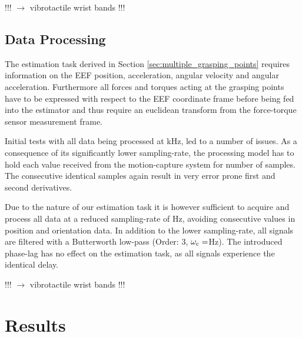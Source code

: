 !!! $\longrightarrow$ vibrotactile wrist bands !!!

\subsection{Data Processing}
The estimation task derived in Section \ref{sec:multiple_grasping_points} requires information on the EEF position, acceleration, angular velocity and angular acceleration. Furthermore all forces and torques acting at the grasping points have to be expressed with respect to the EEF coordinate frame before being fed into the estimator and thus require an euclidean transform from the force-torque sensor measurement frame.

Initial tests with all data being processed at \unit[1]{kHz}, led to a number of issues. As a consequence of its significantly lower sampling-rate, the processing model has to hold each value received from the motion-capture system for number of samples.  The consecutive identical samples again result in very error prone first
and second derivatives.

Due to the nature of our estimation task it is however sufficient to acquire and process all data at a reduced sampling-rate of \unit[100]{Hz}, avoiding consecutive values in position and orientation data. In addition to the lower sampling-rate, all signals are filtered with a Butterworth low-pass (Order: 3, $\omega_{\mathrm{c}} = $\unit[30]{Hz}). The introduced phase-lag has no effect on the estimation task, as all signals experience the identical delay.

!!! $\longrightarrow$ vibrotactile wrist bands !!!

\section{Results}
